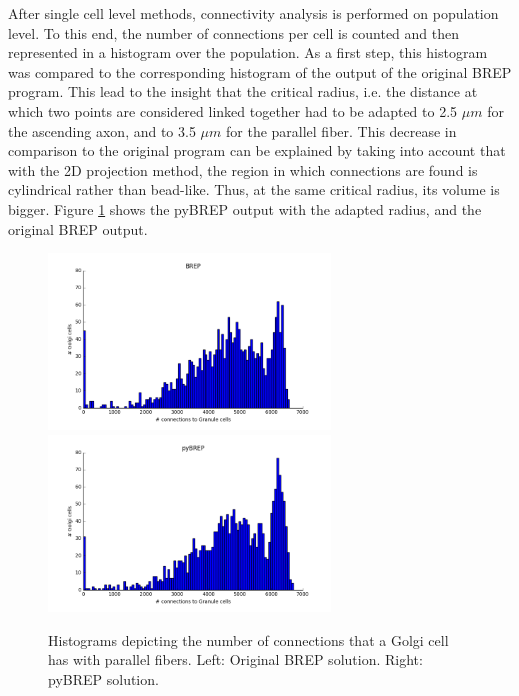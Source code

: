 \documentclass[12pt]{report}
\begin{document}
After single cell level methods, connectivity analysis is performed on population level. To this end, the number of connections per cell is counted and then represented in a histogram over the population. As a first step, this histogram was compared to the corresponding histogram of the output of the original BREP program. This lead to the insight that the critical radius, i.e. the distance at which two points are considered linked together had to be adapted to 2.5 $\mu m$ for the ascending axon, and to 3.5 $\mu m$ for the parallel fiber. This decrease in comparison to the original program can be explained by taking into account that with the 2D projection method, the region in which connections are found is cylindrical rather than bead-like. Thus, at the same critical radius, its volume is bigger. Figure \ref{f:pf_gol_hists} shows the pyBREP output with the adapted radius, and the original BREP output. 

\begin{figure}[h!]
\begin{minipage}[r]{16cm}
\vspace{0pt}
\centering
\includegraphics[width = 7.5cm]{./figures/brep_pf_golgi_hist.png}
\includegraphics[width = 7.5cm]{./figures/pybrep_pf_golgi_hist.png}
\end{minipage}
\hfill
\caption{Histograms depicting the number of connections that a Golgi cell has with parallel fibers. Left: Original BREP solution. Right: pyBREP solution.}
\label{f:pf_gol_hists}
\end{figure}
\end{document}

